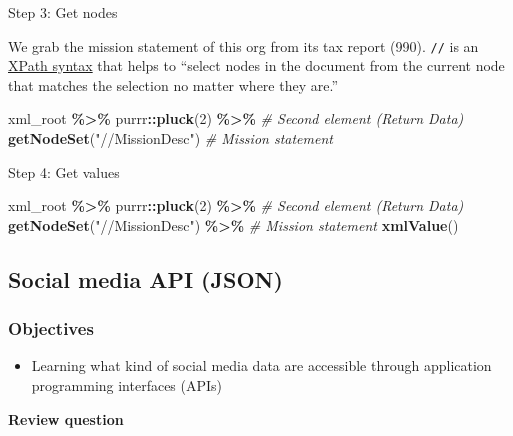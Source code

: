 \documentclass[
]{book}
\newenvironment{Shaded}{\begin{snugshade}}{\end{snugshade}}
\newcommand{\CommentTok}[1]{\textcolor[rgb]{0.56,0.35,0.01}{\textit{#1}}}
\newcommand{\DecValTok}[1]{\textcolor[rgb]{0.00,0.00,0.81}{#1}}
\newcommand{\FunctionTok}[1]{\textcolor[rgb]{0.13,0.29,0.53}{\textbf{#1}}}
\newcommand{\NormalTok}[1]{#1}
\newcommand{\SpecialCharTok}[1]{\textcolor[rgb]{0.81,0.36,0.00}{\textbf{#1}}}
\newcommand{\StringTok}[1]{\textcolor[rgb]{0.31,0.60,0.02}{#1}}
\providecommand{\tightlist}{%
  \setlength{\itemsep}{0pt}\setlength{\parskip}{0pt}}
\begin{document}
Step 3: Get nodes

We grab the mission statement of this org from its tax report (990). \texttt{//} is an \href{https://www.w3schools.com/xml/xpath_syntax.asp}{XPath syntax} that helps to ``select nodes in the document from the current node that matches the selection no matter where they are.''

\begin{Shaded}
\begin{Highlighting}[]
\NormalTok{xml\_root }\SpecialCharTok{\%\textgreater{}\%}
\NormalTok{  purrr}\SpecialCharTok{::}\FunctionTok{pluck}\NormalTok{(}\DecValTok{2}\NormalTok{) }\SpecialCharTok{\%\textgreater{}\%} \CommentTok{\# Second element (Return Data)}
  \FunctionTok{getNodeSet}\NormalTok{(}\StringTok{"//MissionDesc"}\NormalTok{) }\CommentTok{\# Mission statement }
\end{Highlighting}
\end{Shaded}

Step 4: Get values

\begin{Shaded}
\begin{Highlighting}[]
\NormalTok{xml\_root }\SpecialCharTok{\%\textgreater{}\%}
\NormalTok{  purrr}\SpecialCharTok{::}\FunctionTok{pluck}\NormalTok{(}\DecValTok{2}\NormalTok{) }\SpecialCharTok{\%\textgreater{}\%} \CommentTok{\# Second element (Return Data)}
  \FunctionTok{getNodeSet}\NormalTok{(}\StringTok{"//MissionDesc"}\NormalTok{) }\SpecialCharTok{\%\textgreater{}\%} \CommentTok{\# Mission statement }
  \FunctionTok{xmlValue}\NormalTok{()}
\end{Highlighting}
\end{Shaded}

\subsection{Social media API (JSON)}\label{social-media-api-json}

\subsubsection{Objectives}\label{objectives-4}

\begin{itemize}
\tightlist
\item
  Learning what kind of social media data are accessible through application programming interfaces (APIs)
\end{itemize}

\textbf{Review question}
\end{document}
